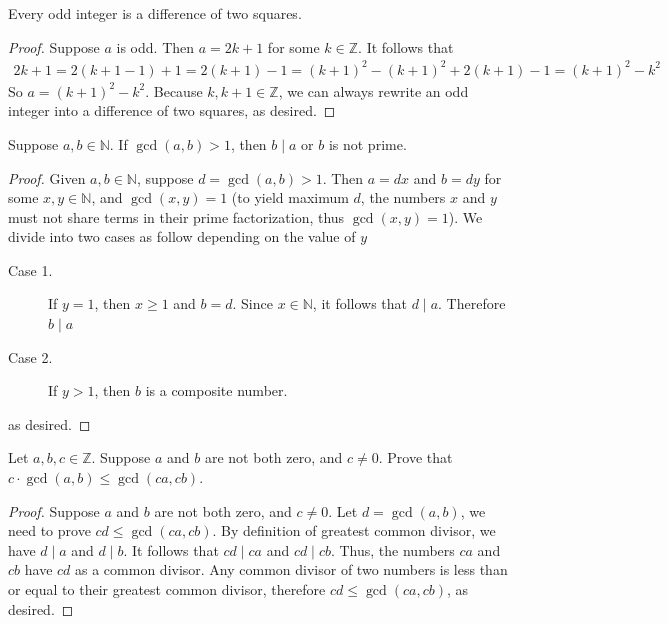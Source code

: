 \documentclass{exam}
\begin{document}
\begin{proposition}{4.26}
    Every odd integer is a difference of two squares.
\end{proposition}

\begin{proof}
    Suppose $a$ is odd. Then $a = 2k + 1$ for some $k\in\mathbb Z$. It follows that
    \begin{align*}
        2k + 1 = 2(k+1-1)+1 = 2(k+1)-1=(k+1)^2-(k+1)^2 + 2(k+1)-1=(k+1)^2-k^2
    \end{align*}
    So $a = (k+1)^2-k^2$. Because $k,k+1\in\mathbb Z$, we can always rewrite an odd integer into a difference of two squares, as desired.
\end{proof}

\begin{proposition}{4.27}
    Suppose $a,b\in\mathbb N$. If $\gcd(a, b)>1$, then $b\mid a$ or $b$ is not prime.
\end{proposition}

\begin{proof}
    Given $a,b\in\mathbb N$, suppose $d = \gcd(a,b)>1$. Then $a = dx$ and $b = dy$ for some $x, y\in\mathbb N$, and $\gcd(x, y) = 1$ (to yield maximum $d$, the numbers $x$ and $y$ must not share terms in their prime factorization, thus $\gcd(x, y) = 1$). We divide into two cases as follow depending on the value of $y$
    \begin{description}
        \item[Case 1. ] If $y=1$, then $x \ge 1$ and $b = d$. Since $x\in\mathbb N$, it follows that $d\mid a$. Therefore $b \mid a$
        \item[Case 2. ] If $y>1$, then $b$ is a composite number.
    \end{description}
    as desired.
\end{proof}

\begin{proposition}{4.28}
Let $a, b, c\in\mathbb Z$. Suppose $a$ and $b$ are not both zero, and $c\neq 0$. Prove that $c\cdot\gcd(a,b)\le\gcd(ca,cb)$.
\end{proposition}

\begin{proof}
    Suppose $a$ and $b$ are not both zero, and $c \neq 0$. Let $d = \gcd(a,b)$, we need to prove $cd \le \gcd(ca,cb)$. By definition of greatest common divisor, we have $d \mid a$ and $d \mid b$. It follows that $cd \mid ca$ and $cd \mid cb$. Thus, the numbers $ca$ and $cb$ have $cd$ as a common divisor. Any common divisor of two numbers is less than or equal to their greatest common divisor, therefore $cd \le \gcd(ca,cb)$, as desired.
\end{proof}
\end{document}
